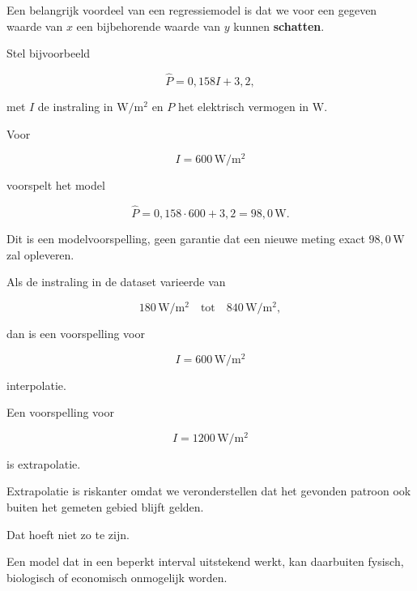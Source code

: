 \documentclass{ximera}
\begin{document}

Een belangrijk voordeel van een regressiemodel is dat we voor een
gegeven waarde van $x$ een bijbehorende waarde van $y$ kunnen
\textbf{schatten}.

Stel bijvoorbeeld

\[
\hat P=0{,}158I+3{,}2,
\]

met $I$ de instraling in $\mathrm{W/m^2}$ en $P$ het elektrisch
vermogen in $\mathrm W$.

Voor

\[
I=600\,\mathrm{W/m^2}
\]

voorspelt het model

\[
\hat P
=
0{,}158\cdot600+3{,}2
=
98{,}0\,\mathrm W.
\]

Dit is een modelvoorspelling, geen garantie dat een nieuwe meting exact
$98{,}0\,\mathrm W$ zal opleveren.


%

\begin{voorbeeld}
Als de instraling in de dataset varieerde van

\[
180\,\mathrm{W/m^2}
\quad\text{tot}\quad
840\,\mathrm{W/m^2},
\]

dan is een voorspelling voor

\[
I=600\,\mathrm{W/m^2}
\]

interpolatie.

Een voorspelling voor

\[
I=1200\,\mathrm{W/m^2}
\]

is extrapolatie.
\end{voorbeeld}

\begin{opmerking}
Extrapolatie is riskanter omdat we veronderstellen dat het gevonden
patroon ook buiten het gemeten gebied blijft gelden.

Dat hoeft niet zo te zijn.

Een model dat in een beperkt interval uitstekend werkt, kan daarbuiten
fysisch, biologisch of economisch onmogelijk worden.
\end{opmerking}





\end{document}
